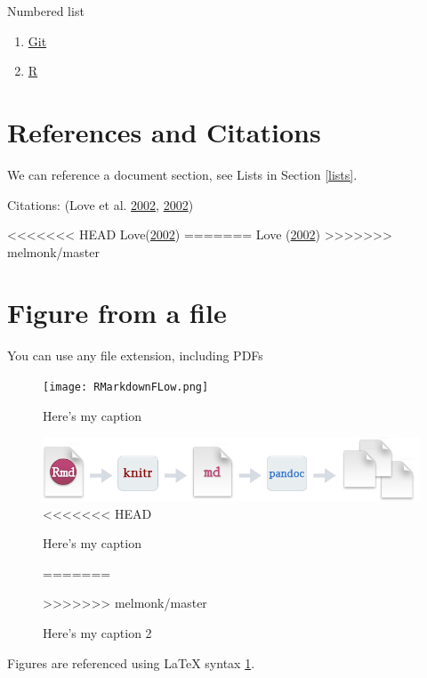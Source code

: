 \documentclass[12pt,]{article}
\begin{document}
Numbered list

\begin{enumerate}[noitemsep,nolistsep,topsep=0pt]

\item \href{https://git-scm.com/book/en/v2/Getting-Started-Installing-Git}{Git}

\item \href{https://cran.r-project.org/bin/windows/base/}{R} 

\end{enumerate}

\section{References and Citations}\label{references-and-citations}

We can reference a document section, see Lists in Section \ref{lists}.

Citations: (Love et al. \protect\hyperlink{ref-Love2002}{2002},
\protect\hyperlink{ref-Love2002}{2002})

<<<<<<< HEAD
Love(\protect\hyperlink{ref-Love2002}{2002})
=======
Love (\protect\hyperlink{ref-Love2002}{2002})
>>>>>>> melmonk/master

\section{Figure from a file}\label{figure-from-a-file}

You can use any file extension, including PDFs

\begin{figure}[htbp]
\centering
\texttt{[image: RMarkdownFLow.png]}
\caption{Here's my caption \label{fig:fig_example}}
\end{figure}

\begin{figure}[htbp]
\centering
\includegraphics{./Figures/RMarkdownFLow1.png}
<<<<<<< HEAD
\caption{Here's my caption \label{fig:fig_example2}}
=======
\caption{Here's my caption 2 \label{fig:fig_example2}}
>>>>>>> melmonk/master
\end{figure}

Figures are referenced using LaTeX syntax \ref{fig:fig_example}.
\end{document}
